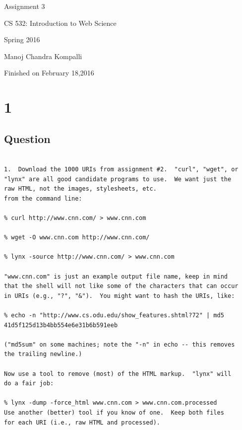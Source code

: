 \documentclass[letterpaper,11pt]{article}
\begin{document}
\begin{titlepage}

\begin{center}

\Huge{Assignment 3}

\Large{CS 532:  Introduction to Web Science}

\Large{Spring 2016}

\Large{Manoj Chandra Kompalli}

\Large Finished on February 18,2016

\end{center}

\end{titlepage}

\newpage
\section*{1}

\subsection*{Question}

\begin{verbatim}

1.  Download the 1000 URIs from assignment #2.  "curl", "wget", or
"lynx" are all good candidate programs to use.  We want just the
raw HTML, not the images, stylesheets, etc.
from the command line:

% curl http://www.cnn.com/ > www.cnn.com

% wget -O www.cnn.com http://www.cnn.com/

% lynx -source http://www.cnn.com/ > www.cnn.com

"www.cnn.com" is just an example output file name, keep in mind
that the shell will not like some of the characters that can occur
in URIs (e.g., "?", "&").  You might want to hash the URIs, like:

% echo -n "http://www.cs.odu.edu/show_features.shtml?72" | md5
41d5f125d13b4bb554e6e31b6b591eeb

("md5sum" on some machines; note the "-n" in echo -- this removes
the trailing newline.) 

Now use a tool to remove (most) of the HTML markup.  "lynx" will
do a fair job:

% lynx -dump -force_html www.cnn.com > www.cnn.com.processed
Use another (better) tool if you know of one.  Keep both files 
for each URI (i.e., raw HTML and processed). 

\end{verbatim}
\end{document}
